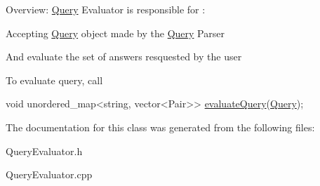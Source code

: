 Overview\+: \hyperlink{class_query}{Query} Evaluator is responsible for \+:
\begin{DoxyItemize}
\item Accepting \hyperlink{class_query}{Query} object made by the \hyperlink{class_query}{Query} Parser
\item And evaluate the set of answers resquested by the user
\end{DoxyItemize}

To evaluate query, call 
\begin{DoxyCode}
\textcolor{keywordtype}{void} unordered\_map<string, vector<Pair>> \hyperlink{class_query_evaluator_a3b4e7218194d6338941eee6ba5a1cd42}{evaluateQuery}(\hyperlink{class_query}{Query});
\end{DoxyCode}
 

The documentation for this class was generated from the following files\+:\begin{DoxyCompactItemize}
\item 
Query\+Evaluator.\+h\item 
Query\+Evaluator.\+cpp\end{DoxyCompactItemize}

